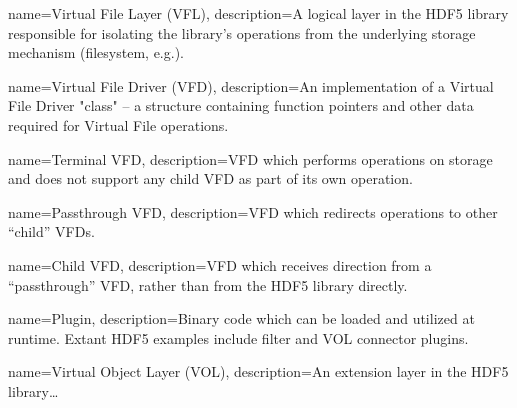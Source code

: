 

\makeglossaries


{
        name=Virtual File Layer (VFL),
        description={A logical layer in the HDF5 library responsible for isolating the
                     library's operations from the underlying storage mechanism
                     (filesystem, e.g.).}
}

{
        name=Virtual File Driver (VFD),
        description={An implementation of a Virtual File Driver "class" – a structure
                     containing function pointers and other data required for Virtual File
                     operations.}
}
 
{
        name=Terminal VFD,
        description={VFD which performs operations on storage and does not support
                     any child VFD as part of its own operation.}
}

{
        name=Passthrough VFD,
        description={VFD which redirects operations to other “child” VFDs.}
}

{
        name=Child VFD,
        description={VFD which receives direction from a “passthrough” VFD, rather
                     than from the HDF5 library directly.}
}

{
        name=Plugin,
        description={Binary code which can be loaded and utilized at runtime. Extant
                     HDF5 examples include filter and VOL connector plugins.}
}

{
        name=Virtual Object Layer (VOL),
        description={An extension layer in the HDF5 library\ldots}
}






